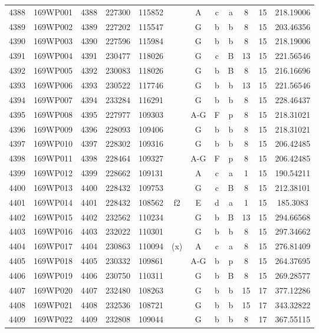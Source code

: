 \begin{tabular}{|*{12}{c|}}
4388 & 169WP001 & 4388 & 227300 & 115852 &  & A & c & a & 8 & 15 & 218.19006 \\ 
4389 & 169WP002 & 4389 & 227202 & 115547 &  & G & b & b & 8 & 15 & 203.46356 \\ 
4390 & 169WP003 & 4390 & 227596 & 115984 &  & G & b & b & 8 & 15 & 218.19006 \\ 
4391 & 169WP004 & 4391 & 230477 & 118026 &  & G & c & B & 13 & 15 & 221.56546 \\ 
4392 & 169WP005 & 4392 & 230083 & 118026 &  & G & b & B & 8 & 15 & 216.16696 \\ 
4393 & 169WP006 & 4393 & 230522 & 117746 &  & G & b & b & 13 & 15 & 221.56546 \\ 
4394 & 169WP007 & 4394 & 233284 & 116291 &  & G & b & b & 8 & 15 & 228.46437 \\ 
4395 & 169WP008 & 4395 & 227977 & 109303 &  & A-G & F & p & 8 & 15 & 218.31021 \\ 
4396 & 169WP009 & 4396 & 228093 & 109406 &  & G & b & b & 8 & 15 & 218.31021 \\ 
4397 & 169WP010 & 4397 & 228302 & 109316 &  & G & b & b & 8 & 15 & 206.42485 \\ 
4398 & 169WP011 & 4398 & 228464 & 109327 &  & A-G & F & p & 8 & 15 & 206.42485 \\ 
4399 & 169WP012 & 4399 & 228662 & 109131 &  & A & c & a & 1 & 15 & 190.54211 \\ 
4400 & 169WP013 & 4400 & 228432 & 109753 &  & G & c & B & 8 & 15 & 212.38101 \\ 
4401 & 169WP014 & 4401 & 228432 & 108562 & f2 & E & d & a & 1 & 15 & 185.3083 \\ 
4402 & 169WP015 & 4402 & 232562 & 110234 &  & G & b & B & 13 & 15 & 294.66568 \\ 
4403 & 169WP016 & 4403 & 232022 & 110301 &  & G & b & b & 8 & 15 & 297.34662 \\ 
4404 & 169WP017 & 4404 & 230863 & 110094 & (x) & A & c & a & 8 & 15 & 276.81409 \\ 
4405 & 169WP018 & 4405 & 230332 & 109861 &  & A-G & b & p & 8 & 15 & 264.37695 \\ 
4406 & 169WP019 & 4406 & 230750 & 110311 &  & G & b & B & 8 & 15 & 269.28577 \\ 
4407 & 169WP020 & 4407 & 232480 & 108263 &  & G & b & b & 15 & 17 & 377.12286 \\ 
4408 & 169WP021 & 4408 & 232536 & 108721 &  & G & b & b & 15 & 17 & 343.32822 \\ 
4409 & 169WP022 & 4409 & 232808 & 109044 &  & G & b & b & 8 & 17 & 367.55115 \\ 

\end{tabular}
